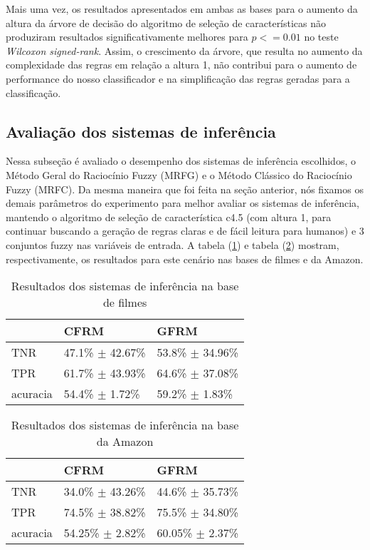 Mais uma vez, os resultados apresentados em ambas as bases para o aumento da altura da árvore de decisão do algoritmo de seleção de características não produziram resultados significativamente melhores para $p <= 0.01$ no teste \textit{Wilcoxon signed-rank}. Assim, o crescimento da árvore, que resulta no aumento da complexidade das regras em relação a altura 1, não contribui para o aumento de performance do nosso classificador e na simplificação das regras geradas para a classificação. 

\subsection{Avaliação dos sistemas de inferência}

Nessa subseção é avaliado o desempenho dos sistemas de inferência escolhidos, o Método Geral do Raciocínio Fuzzy (MRFG) e o Método Clássico do Raciocínio Fuzzy (MRFC). Da mesma maneira que foi feita na seção anterior, nós fixamos os demais parâmetros do experimento para melhor avaliar os sistemas de inferência, mantendo o algoritmo de seleção de característica c4.5 (com altura 1, para continuar buscando a geração de regras claras e de fácil leitura para humanos) e 3 conjuntos fuzzy nas variáveis de entrada. A tabela (\ref{table:movies2}) e tabela (\ref{table:amazon2}) mostram, respectivamente, os resultados para este cenário nas bases de filmes e da Amazon.

\begin{table}[!h]
    \begin{tabular}{lll}
 	~         			& CFRM 								& GFRM \\ \hline
    TNR 				& 47.1\% $\pm$ 42.67\%   & 53.8\% $\pm$ 34.96\%    \\
    TPR    			& 61.7\% $\pm$ 43.93\%   & 64.6\% $\pm$ 37.08\%   \\
    acuracia  		& 54.4\% $\pm$ 1.72\%    	& 59.2\% $\pm$ 1.83\%    \\
    \end{tabular}
    \caption{Resultados dos sistemas de inferência na base de filmes}
	\label{table:movies2}
\end{table}

%
%
%

\begin{table}[!h]
    \begin{tabular}{lll}
    ~         			& CFRM 									& GFRM \\ \hline
    TNR 				& 34.0\% $\pm$ 43.26\%    	& 44.6\% $\pm$ 35.73\%    \\
    TPR    			& 74.5\% $\pm$ 38.82\%    	& 75.5\% $\pm$ 34.80\%    \\
    acuracia  		& 54.25\% $\pm$ 2.82\%    	& 60.05\% $\pm$ 2.37\%   \\
    \end{tabular}
    \caption{Resultados dos sistemas de inferência na base da Amazon}
	\label{table:amazon2}
\end{table}

